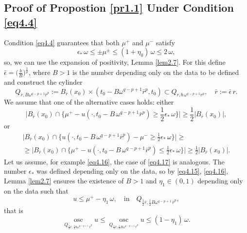 \documentclass[a4paper,11pt,fullpage]{article}
\DeclareMathOperator*{\osc}{osc}
\numberwithin{equation}{section}
\begin{document}
\subsection{Proof of Propostion \ref{pr1.1} Under Condition \eqref{eq4.4}}

Condition \eqref{eq4.4} guarantees that both $\mu^+$ and $\mu^-$ satisfy
\begin{equation}\label{eq4.15}
\epsilon_*\,\omega \leqslant \pm \mu^{\pm}\leqslant (1+\eta_0)\,\omega\leqslant 2\,\omega,
\end{equation}
so, we can use the expansion of positivity, Lemma \ref{lem2.7}. For this define $\bar{\epsilon}=\big(\frac{b}{B}\big)^{\frac{1}{p}}$,
where $B>1$ is the number depending only on the data to be defined and construct the cylinder
$$Q_{\bar{r}, B\omega^{q-p+1} \bar{r}^p}:=B_{\bar{r}}(x_0)\times(t_0-B\omega^{q-p+1}\bar{r}^p, t_0)\subset Q_{r, b\,\omega^{q-p+1} r^p},
\quad \bar{r}:=\bar{\epsilon}\,r.$$
We assume that one of the alternative cases holds: either
\begin{equation}\label{eq4.16}
\big|B_{\bar{r}}(x_0)\cap\big\{\mu^+-u(\cdot, t_0-B\,\omega^{q-p+1}\bar{r}^p)\geqslant \frac{1}{2}\epsilon_*\,\omega\big\}\big|\geqslant \frac{1}{2}|B_{\bar{r}}(x_0)|,
\end{equation}
or
\begin{multline}\label{eq4.17}
\big|B_{\bar{r}}(x_0)\cap\big\{u(\cdot, t_0-B\,\omega^{q-p+1}\bar{r}^p)-\mu^-\geqslant \frac{1}{2}\epsilon_*\,\omega\big\}\big|\geqslant\\
\geqslant
\big|B_{\bar{r}}(x_0)\cap\big\{\mu^+-u(\cdot, t_0-B\,\omega^{q-p+1}\bar{r}^p)\leqslant \frac{1}{2}\epsilon_*\,\omega\big\}\big|\geqslant \frac{1}{2}|B_{\bar{r}}(x_0)|.
\end{multline}
Let us assume, for example \eqref{eq4.16}, the case of \eqref{eq4.17} is analogous. The number $\epsilon_*$ was defined  depending only on the data, so by \eqref{eq4.15}, \eqref{eq4.16}, Lemma \ref{lem2.7} ensures the existence of $B>1$ and $\eta_1 \in (0, 1)$ depending only on the data  such that
\begin{equation*}
u\leqslant \mu^+-\eta_1\,\omega,\quad \text{in}\quad Q_{\frac{1}{2}\bar{r}, \frac{1}{2}B \omega^{q-p+1} \,\bar{r}^p},
\end{equation*}
that is 
\begin{equation}\label{eq4.18}
\osc\limits_{Q_{\frac{1}{2}\bar{r}, \frac{1}{2}b \omega^{q-p+1} \,\bar{r}^p}} u\leqslant
\osc\limits_{Q_{\frac{1}{2}\bar{r}, \frac{1}{2}B \omega^{q-p+1} \,\bar{r}^p}} u\leqslant (1-\eta_1)\,\omega.
\end{equation}
\end{document}
